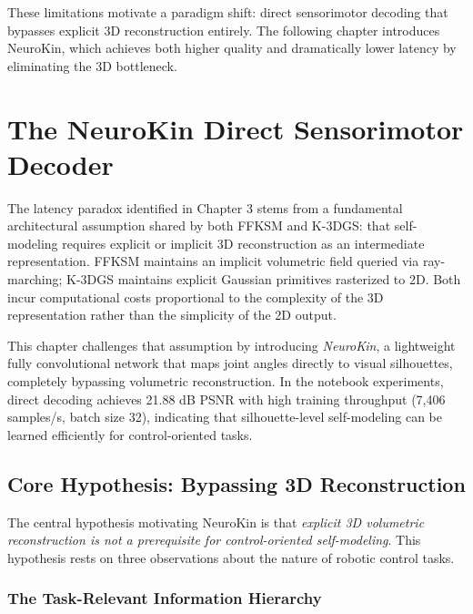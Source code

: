 \documentclass[12pt,a4paper,oneside]{report}
\begin{document}
These limitations motivate a paradigm shift: direct sensorimotor decoding that bypasses explicit 3D reconstruction entirely. The following chapter introduces NeuroKin, which achieves both higher quality and dramatically lower latency by eliminating the 3D bottleneck.









\chapter{The NeuroKin Direct Sensorimotor Decoder}

The latency paradox identified in Chapter 3 stems from a fundamental architectural assumption shared by both FFKSM and K-3DGS: that self-modeling requires explicit or implicit 3D reconstruction as an intermediate representation. FFKSM maintains an implicit volumetric field queried via ray-marching; K-3DGS maintains explicit Gaussian primitives rasterized to 2D. Both incur computational costs proportional to the complexity of the 3D representation rather than the simplicity of the 2D output.

This chapter challenges that assumption by introducing \textit{NeuroKin}, a lightweight fully convolutional network that maps joint angles directly to visual silhouettes, completely bypassing volumetric reconstruction. In the notebook experiments, direct decoding achieves 21.88 dB PSNR with high training throughput (7,406 samples/s, batch size 32), indicating that silhouette-level self-modeling can be learned efficiently for control-oriented tasks.

\section{Core Hypothesis: Bypassing 3D Reconstruction}

The central hypothesis motivating NeuroKin is that \textit{explicit 3D volumetric reconstruction is not a prerequisite for control-oriented self-modeling}. This hypothesis rests on three observations about the nature of robotic control tasks.

\subsection{The Task-Relevant Information Hierarchy}
\end{document}
